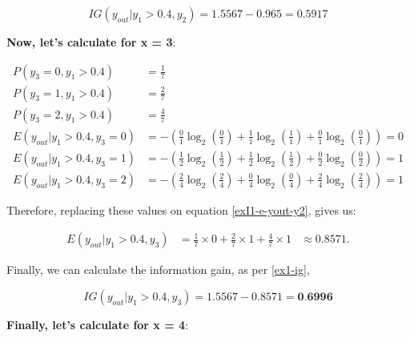 \documentclass[12pt]{article}
\begin{document}
\begin{enumerate}[leftmargin=\labelsep]
    \[
        IG(y_{out} |y_1 > 0.4, y_{2}) = 1.5567 - 0.965 = 0.5917
    \]

    \textbf{Now, let's calculate for x = 3}:

    \[
        \begin{aligned}
            P(y_3 = 0, y_1 > 0.4)          & = \frac{1}{7}                                                                                       \\
            P(y_3 = 1, y_1 > 0.4)          & = \frac{2}{7}                                                                                       \\
            P(y_3 = 2, y_1 > 0.4)          & = \frac{4}{7}                                                                                       \\
            E(y_{out} | y_1 > 0.4 , y_3 = 0) & = - \left(\frac{0}{1} \log_2\left(\frac{0}{1}\right) + \frac{1}{1} \log_2\left(\frac{1}{1}\right)
                + \frac{0}{1} \log_2\left(\frac{0}{1}\right)\right) = 0                                                                          \\
            E(y_{out} | y_1 > 0.4 , y_3 = 1) & = - \left(\frac{1}{2} \log_2\left(\frac{1}{2}\right) + \frac{1}{2} \log_2\left(\frac{1}{2}\right)
                + \frac{0}{2} \log_2\left(\frac{0}{2}\right)\right) = 1                                                                          \\
            E(y_{out} | y_1 > 0.4 , y_3 = 2) & = - \left(\frac{2}{4} \log_2\left(\frac{2}{4}\right) + \frac{0}{4} \log_2\left(\frac{0}{4}\right)
                + \frac{2}{4} \log_2\left(\frac{2}{4}\right)\right) = 1
        \end{aligned}
    \]

    Therefore, replacing these values on equation \eqref{exI1-e-yout-y2}, gives us:

    \[
        \begin{aligned}
            E(y_{out} | y_1>0.4, y_3) & = \frac{1}{7} \times 0 + \frac{2}{7} \times 1 +  \frac{4}{7} \times 1 & \approx 0.8571.
        \end{aligned}
    \]

    Finally, we can calculate the information gain, as per \eqref{ex1-ig},

    \[
        IG(y_{out} | y_1 > 0.4, y_{3}) = 1.5567 - 0.8571 = \textbf{0.6996}
    \]

    \textbf{Finally, let's calculate for x = 4}:


\end{enumerate}
\end{document}
